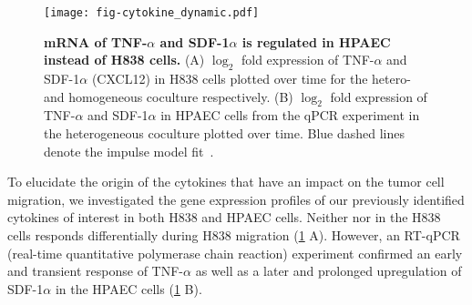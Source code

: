\begin{figure}[!ht]
\begin{center}
\texttt{[image: fig-cytokine\_dynamic.pdf]}
\end{center}
\caption[Gene expression of \tnfa and \sdfonea]{
{\bf mRNA of TNF-$\alpha$ and SDF-1$\alpha$ is regulated in HPAEC instead of H838 
cells.}
(A) $\log_2$ fold expression of TNF-$\alpha$ and SDF-1$\alpha$ (CXCL12) in H838 
cells plotted
over time for the hetero- and homogeneous coculture respectively.
(B) $\log_2$ fold expression of TNF-$\alpha$ and SDF-1$\alpha$ in HPAEC cells 
from the qPCR
experiment in the heterogeneous coculture plotted
over time. Blue dashed lines denote the impulse model fit~\citep{Chechik2009}.
}
\label{fig:cytokine_dynamic}
\end{figure}

To elucidate the origin of the cytokines that have an impact on the tumor
cell migration,
we investigated the gene expression profiles of
our previously identified cytokines of interest in both H838 and HPAEC cells. 
Neither \tnfa nor \sdfonea in the H838 cells
responds differentially during H838 migration (\ref{fig:cytokine_dynamic} A).
However, 
an RT-qPCR (real-time quantitative polymerase chain reaction) experiment confirmed an early and transient response of  
TNF-$\alpha$ as well as a later and prolonged upregulation of 
SDF-1$\alpha$ in the HPAEC cells (\ref{fig:cytokine_dynamic} B). 


